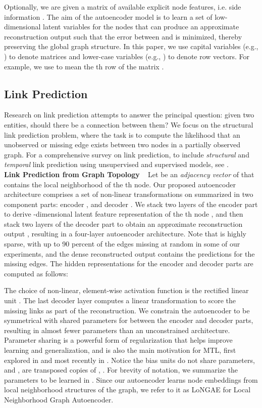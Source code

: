 \documentclass[letterpaper, conference]{IEEEtran}
\begin{document}
Optionally, we are given a matrix of available explicit node features, i.e. side information . The aim of the autoencoder model  is to learn a set of low-dimensional latent variables for the nodes  that can produce an approximate reconstruction output  such that the error between  and  is minimized, thereby preserving the global graph structure. In this paper, we use capital variables (e.g., ) to denote matrices and lower-case variables (e.g., ) to denote row vectors. For example, we use  to mean the th row of the matrix .

\subsection{Link Prediction}

Research on link prediction attempts to answer the principal question: given two entities, should there be a connection between them? We focus on the structural link prediction problem, where the task is to compute the likelihood that an unobserved or missing edge exists between two nodes in a partially observed graph. For a comprehensive survey on link prediction, to include \emph{structural} and \emph{temporal} link prediction using unsupervised and supervised models, see \cite{Wang:2014}. \\

\noindent \textbf{Link Prediction from Graph Topology} ~ Let  be an \emph{adjacency vector} of  that contains the local neighborhood of the th node. Our proposed autoencoder architecture comprises a set of non-linear transformations on  summarized in two component parts: encoder , and decoder . We stack two layers of the encoder part to derive -dimensional latent feature representation of the th node , and then stack two layers of the decoder part to obtain an approximate reconstruction output , resulting in a four-layer autoencoder architecture. Note that  is highly sparse, with up to 90 percent of the edges missing at random in some of our experiments, and the dense reconstructed output  contains the predictions for the missing edges. The hidden representations for the encoder and decoder parts are computed as follows:


The choice of non-linear, element-wise activation function is the rectified linear unit  \cite{Nair:2010}. The last decoder layer computes a linear transformation to score the missing links as part of the reconstruction. We constrain the autoencoder to be symmetrical with shared parameters for  between the encoder and decoder parts, resulting in almost  fewer parameters than an unconstrained architecture. Parameter sharing is a powerful form of regularization that helps improve learning and generalization, and is also the main motivation for MTL, first explored in \cite{Caruana:1993} and most recently in \cite{Yang:2017}. Notice the bias units  do not share parameters, and ,  are transposed copies of , . For brevity of notation, we summarize the parameters to be learned in . Since our autoencoder learns node embeddings from local neighborhood structures of the graph, we refer to it as LoNGAE for Local Neighborhood Graph Autoencoder.\\
\end{document}
